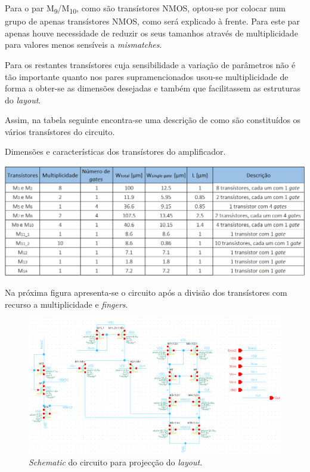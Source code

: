 \documentclass[11pt]{article}
\numberwithin{equation}{section}
\begin{document}
Para o par M\textsubscript{9}/M\textsubscript{10}, como são transístores NMOS, optou-se por colocar num grupo de apenas transístores NMOS, como será explicado à frente. Para este par apenas houve necessidade de reduzir os seus tamanhos através de multiplicidade para valores menos sensíveis a \textit{mismatches}.

Para os restantes transístores cuja sensibilidade a variação de parâmetros não é tão importante quanto nos pares supramencionados usou-se multiplicidade de forma a obter-se as dimensões desejadas e também que facilitassem as estruturas do \textit{layout}.

Assim, na tabela seguinte encontra-se uma descrição de como são constituídos os vários transístores do circuito.

\begin{table}[H]
	\centering
	\caption{Dimensões e características dos transístores do amplificador.}
	\vspace{-1.5mm}
	\includegraphics[keepaspectratio=true, scale=0.30]{teoricas/dimensoes2}
\end{table}

Na próxima figura apresenta-se o circuito após a divisão dos transístores com recurso a multiplicidade e \textit{fingers}.

\begin{figure}[H]
	\centering
	\includegraphics[keepaspectratio=true, scale=0.55]{exps/schematicdiv}
	\vspace{-0.5em}
	\caption{\textit{Schematic} do circuito para projecção do \textit{layout}.}
	\vspace{-0.8em}
\end{figure} 
\end{document}
